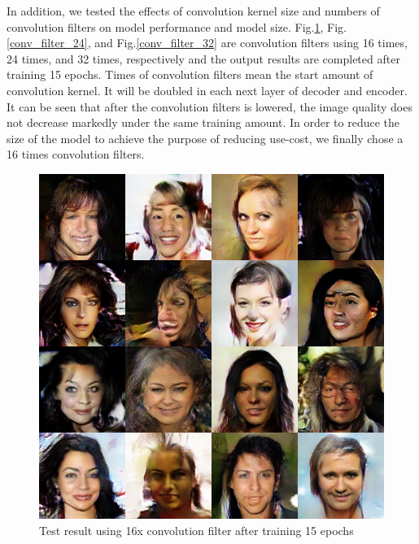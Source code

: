 In addition, we tested the effects of convolution kernel size and numbers of convolution filters on model performance and model size.
Fig.\ref{conv_filter_16}, Fig.\ref{conv_filter_24}, and Fig.\ref{conv_filter_32} are convolution filters using 16 times, 24 times, and 32 times,
    respectively and the output results are completed after training 15 epochs.
Times of convolution filters mean the start amount of convolution kernel.
It will be doubled in each next layer of decoder and encoder.
It can be seen that after the convolution filters is lowered,
    the image quality does not decrease markedly under the same training amount.
In order to reduce the size of the model to achieve the purpose of reducing use-cost,
    we finally chose a 16 times convolution filters.

\begin{figure}
    \begin{minipage}[t]{0.48\linewidth}
        \centering
        \includegraphics[width=\textwidth]{figures/result_conv_filter_16.png}
        \caption{Test result using 16x convolution filter after training 15 epochs}
        \label{conv_filter_16}
    \end{minipage}
        \hfill
    \begin{minipage}[t]{0.48\linewidth}
        \centering

\end{minipage}
\end{figure}
